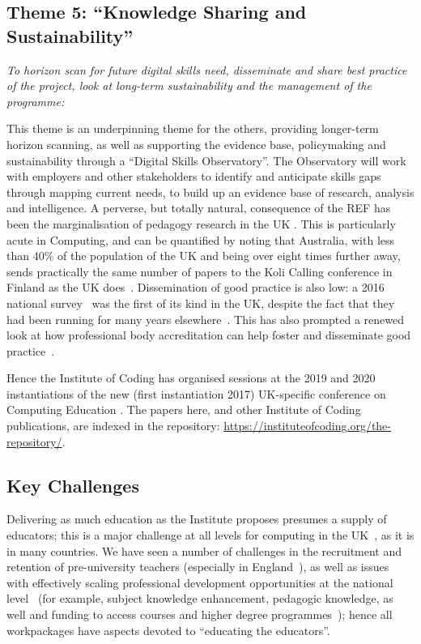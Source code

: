 \documentclass[conference]{IEEEtran}
\begin{document}
\subsection{Theme 5: ``Knowledge Sharing and Sustainability''}

{\emph{To horizon scan for future digital skills need, disseminate and
share best practice of the project, look at long-term sustainability
and the management of the programme:}}\newline

\noindent This theme is an underpinning theme for the others,
providing longer-term horizon scanning, as well as supporting the
evidence base, policymaking and sustainability through a ``Digital
Skills Observatory''. The Observatory will work with employers and
other stakeholders to identify and anticipate skills gaps through
mapping current needs, to build up an evidence base of research,
analysis and intelligence.  A perverse, but totally natural,
consequence of the REF has been the marginalisation of pedagogy
research in the UK \cite{Cottonetal2018a}. This is particularly acute
in Computing, and can be quantified by noting that Australia, with
less than 40\% of the population of the UK and being over eight times
further away, sends practically the same number of papers to the Koli
Calling conference in Finland as the UK
does~\cite{Simon2016a}. Dissemination of good practice is also low: a
2016 national survey~\cite{murphy-et-al:programming2017} was the first
of its kind in the UK, despite the fact that they had been running for
many years elsewhere~\cite{simon-et-al:sigcse2018}. This has also
prompted a renewed look at how professional body accreditation can
help foster and disseminate good practice~\cite{crick-et-al:cep2020}.

Hence the Institute of Coding has organised sessions at the 2019 and 2020 instantiations of the new (first instantiation 2017) UK-specific conference on Computing Education \cite{CEP2019,CEP2020}. The papers here, and other Institute of Coding publications, are indexed in the repository: \url{ https://instituteofcoding.org/the-repository/}.

\subsection{Key Challenges}

Delivering as much education as the Institute proposes presumes a
supply of educators; this is a major challenge at all levels for
computing in the UK~\cite{brown-et-al:toce2014}, as it is in many
countries. We have seen a number of challenges in the recruitment and
retention of pre-university teachers (especially in
England~\cite{sentance+waite:2018}), as well as issues with
effectively scaling professional development opportunities at the
national level~\cite{sentance+csizmadia:2017} (for example, subject
knowledge enhancement, pedagogic knowledge, as well and funding to
access courses and higher degree
programmes~\cite{sentance-et-al-wipsce2012,moller+crick:jce2018});
hence all workpackages have aspects devoted to ``educating the
educators''.
\end{document}
